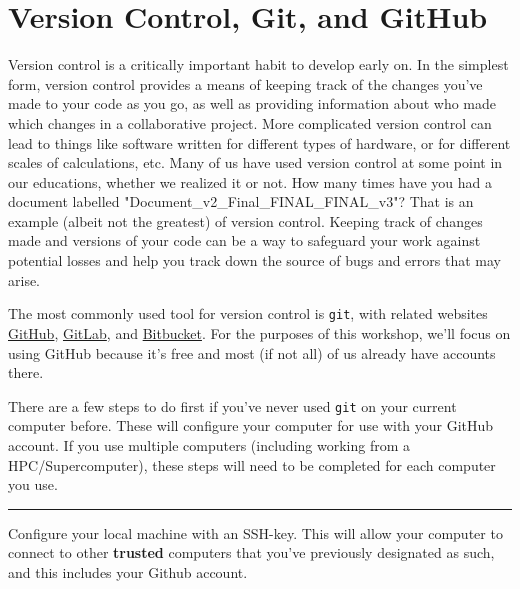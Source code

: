 \section{Version Control, Git, and GitHub}
Version control is a critically important habit to develop early on.
In the simplest form, version control provides a means of keeping track of the changes you've made to your code as you go, as well as providing information about who made which changes in a collaborative project.
More complicated version control can lead to things like software written for different types of hardware, or for different scales of calculations, etc.
Many of us have used version control at some point in our educations, whether we realized it or not.
How many times have you had a document labelled "Document\_v2\_Final\_FINAL\_FINAL\_v3"?
That is an example (albeit not the greatest) of version control.
Keeping track of changes made and versions of your code can be a way to safeguard your work against potential losses and help you track down the source of bugs and errors that may arise.


The most commonly used tool for version control is \texttt{git}, with related websites \href{https://www.github.com}{GitHub}, \href{https://about.gitlab.com/}{GitLab}, and \href{https://bitbucket.org/}{Bitbucket}. 
For the purposes of this workshop, we'll focus on using GitHub because it's free and most (if not all) of us already have accounts there.

There are a few steps to do first if you've never used \texttt{git} on your current computer before. 
These will configure your computer for use with your GitHub account. 
If you use multiple computers (including working from a HPC/Supercomputer), these steps will need to be completed for each computer you use.

\begin{center}\rule{0.5\linewidth}{0.5pt}\end{center}

Configure your local machine with an SSH-key. 
This will allow your computer to connect to other \textbf{trusted} computers that you've previously designated as such, and this includes your Github account.

\begin{Shaded}
\begin{Highlighting}[]
     
\end{Highlighting}
\end{Shaded}

